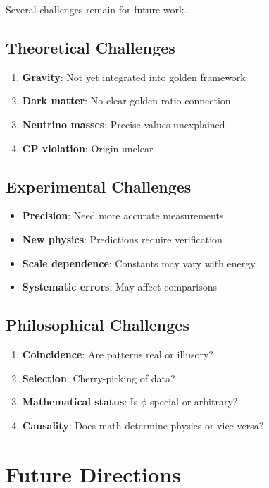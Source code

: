 Several challenges remain for future work.

\subsection{Theoretical Challenges}

\begin{enumerate}
    \item \textbf{Gravity}: Not yet integrated into golden framework
    \item \textbf{Dark matter}: No clear golden ratio connection
    \item \textbf{Neutrino masses}: Precise values unexplained
    \item \textbf{CP violation}: Origin unclear
\end{enumerate}

\subsection{Experimental Challenges}

\begin{itemize}
    \item \textbf{Precision}: Need more accurate measurements
    \item \textbf{New physics}: Predictions require verification
    \item \textbf{Scale dependence}: Constants may vary with energy
    \item \textbf{Systematic errors}: May affect comparisons
\end{itemize}

\subsection{Philosophical Challenges}

\begin{enumerate}
    \item \textbf{Coincidence}: Are patterns real or illusory?
    \item \textbf{Selection}: Cherry-picking of data?
    \item \textbf{Mathematical status}: Is $\phi$ special or arbitrary?
    \item \textbf{Causality}: Does math determine physics or vice versa?
\end{enumerate}

\section{Future Directions}

